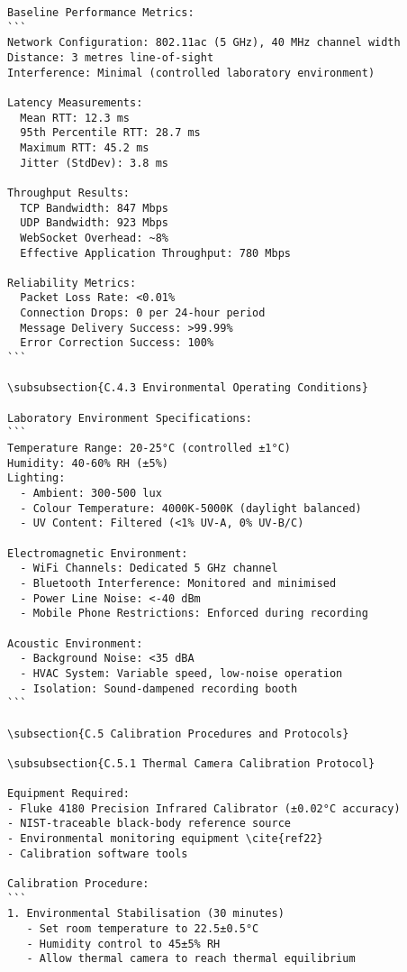 \begin{verbatim}
Baseline Performance Metrics:
```
Network Configuration: 802.11ac (5 GHz), 40 MHz channel width
Distance: 3 metres line-of-sight
Interference: Minimal (controlled laboratory environment)

Latency Measurements:
  Mean RTT: 12.3 ms
  95th Percentile RTT: 28.7 ms
  Maximum RTT: 45.2 ms
  Jitter (StdDev): 3.8 ms

Throughput Results:
  TCP Bandwidth: 847 Mbps
  UDP Bandwidth: 923 Mbps
  WebSocket Overhead: ~8%
  Effective Application Throughput: 780 Mbps

Reliability Metrics:
  Packet Loss Rate: <0.01%
  Connection Drops: 0 per 24-hour period
  Message Delivery Success: >99.99%
  Error Correction Success: 100%
```

\subsubsection{C.4.3 Environmental Operating Conditions}

Laboratory Environment Specifications:
```
Temperature Range: 20-25°C (controlled ±1°C)
Humidity: 40-60% RH (±5%)
Lighting:
  - Ambient: 300-500 lux
  - Colour Temperature: 4000K-5000K (daylight balanced)
  - UV Content: Filtered (<1% UV-A, 0% UV-B/C)

Electromagnetic Environment:
  - WiFi Channels: Dedicated 5 GHz channel
  - Bluetooth Interference: Monitored and minimised
  - Power Line Noise: <-40 dBm
  - Mobile Phone Restrictions: Enforced during recording

Acoustic Environment:
  - Background Noise: <35 dBA
  - HVAC System: Variable speed, low-noise operation
  - Isolation: Sound-dampened recording booth
```

\subsection{C.5 Calibration Procedures and Protocols}

\subsubsection{C.5.1 Thermal Camera Calibration Protocol}

Equipment Required:
- Fluke 4180 Precision Infrared Calibrator (±0.02°C accuracy)
- NIST-traceable black-body reference source
- Environmental monitoring equipment \cite{ref22}
- Calibration software tools

Calibration Procedure:
```
1. Environmental Stabilisation (30 minutes)
   - Set room temperature to 22.5±0.5°C
   - Humidity control to 45±5% RH
   - Allow thermal camera to reach thermal equilibrium


\end{verbatim}
